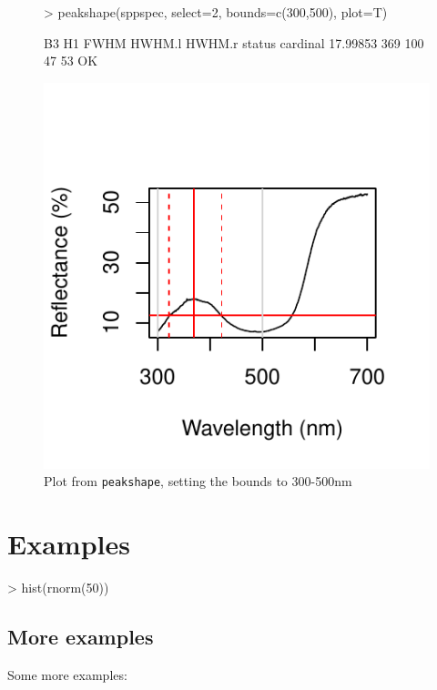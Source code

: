 \documentclass{article}
\newcommand{\code}[1]{{\tt #1}}  %
\begin{document}
\begin{figure}[h] %
\begin{center}
\begin{Schunk}
\begin{Sinput}
> peakshape(sppspec, select=2, bounds=c(300,500), plot=T)
\end{Sinput}
\begin{Soutput}
               B3  H1 FWHM HWHM.l HWHM.r status
cardinal 17.99853 369  100     47     53     OK
\end{Soutput}
\end{Schunk}
\includegraphics{pavo-fwhm2}
\end{center}
\caption{Plot from \code{peakshape}, setting the bounds to 300-500nm}
\label{figure:fwhm2}
\end{figure}


\section*{Examples}


\begin{Schunk}
\begin{Sinput}
> hist(rnorm(50))
\end{Sinput}
\end{Schunk}


\subsection*{More examples}

Some more examples:


\end{document}
